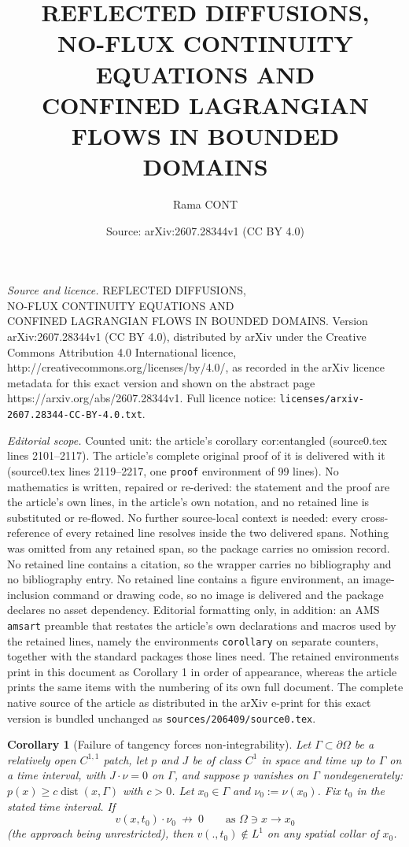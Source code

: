 \documentclass[10pt,a4paper]{amsart}
\title{REFLECTED DIFFUSIONS,\\ NO-FLUX CONTINUITY EQUATIONS AND\\ CONFINED LAGRANGIAN FLOWS IN BOUNDED DOMAINS}
\author{Rama CONT}
\date{Source: arXiv:2607.28344v1 (CC BY 4.0)}
\newtheorem{corollary}{Corollary}
\begin{document}
\maketitle

\noindent\emph{Source and licence.} REFLECTED DIFFUSIONS,\\ NO-FLUX CONTINUITY EQUATIONS AND\\ CONFINED LAGRANGIAN FLOWS IN BOUNDED DOMAINS. Version arXiv:2607.28344v1 (CC BY 4.0), distributed by arXiv under the Creative Commons Attribution 4.0 International licence, http://creativecommons.org/licenses/by/4.0/, as recorded in the arXiv licence metadata for this exact version and shown on the abstract page https://arxiv.org/abs/2607.28344v1. Full licence notice: \texttt{licenses/arxiv-2607.28344-CC-BY-4.0.txt}.\par\smallskip

\noindent\textit{Editorial scope.} Counted unit: the article's corollary cor:entangled (source0.tex lines 2101--2117). The article's complete original proof of it is delivered with it (source0.tex lines 2119--2217, one \texttt{proof} environment of 99 lines). No mathematics is written, repaired or re-derived: the statement and the proof are the article's own lines, in the article's own notation, and no retained line is substituted or re-flowed.  No further source-local context is needed: every cross-reference of every retained line resolves inside the two delivered spans.  Nothing was omitted from any retained span, so the package carries no omission record.  No retained line contains a citation, so the wrapper carries no bibliography and no bibliography entry.  No retained line contains a figure environment, an image-inclusion command or drawing code, so no image is delivered and the package declares no asset dependency.  Editorial formatting only, in addition: an AMS \texttt{amsart} preamble that restates the article's own declarations and macros used by the retained lines, namely the environments \texttt{corollary} on separate counters, together with the standard packages those lines need.  The retained environments print in this document as Corollary 1 in order of appearance, whereas the article prints the same items with the numbering of its own full document.  The complete native source of the article as distributed in the arXiv e-print for this exact version is bundled unchanged as \texttt{sources/206409/source0.tex}.
\begin{corollary}[Failure of tangency forces non-integrability]
\label{cor:entangled}
Let $\Gamma\subset\partial\Omega$ be a relatively open $C^{1,1}$ patch,
let $p$ and $J$ be of class $C^1$ in space and time up to $\Gamma$
on a time interval, with $J\cdot\nu=0$ on $\Gamma$, and suppose $p$
vanishes on $\Gamma$ nondegenerately:
$p(x)\ge c\operatorname{dist}(x,\Gamma)$ with $c>0$. Let
$x_0\in\Gamma$ and $\nu_0:=\nu(x_0)$.
Fix $t_0$ 
 in the stated time interval. If
\[
v(x,t_0)\cdot\nu_0\ \not\longrightarrow\ 0
\qquad\text{as }\Omega\ni x\to x_0
\]
\emph{(}the approach being unrestricted\emph{)}, then $v(.,t_0)\notin L^1$
on any spatial collar of $x_0$.
\end{corollary}
\end{document}
